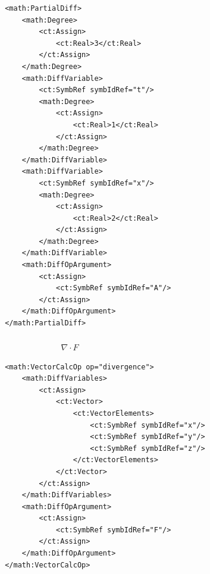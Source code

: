 \lstset{language=XML}
\begin{lstlisting}
                    <math:PartialDiff>
                        <math:Degree>
                            <ct:Assign>
                                <ct:Real>3</ct:Real>
                            </ct:Assign>
                        </math:Degree>
                        <math:DiffVariable>
                            <ct:SymbRef symbIdRef="t"/>
                            <math:Degree>
                                <ct:Assign>
                                    <ct:Real>1</ct:Real>
                                </ct:Assign>
                            </math:Degree>
                        </math:DiffVariable>
                        <math:DiffVariable>
                            <ct:SymbRef symbIdRef="x"/>
                            <math:Degree>
                                <ct:Assign>
                                    <ct:Real>2</ct:Real>
                                </ct:Assign>
                            </math:Degree>
                        </math:DiffVariable>
                        <math:DiffOpArgument>
                            <ct:Assign>
                                <ct:SymbRef symbIdRef="A"/>
                            </ct:Assign>
                        </math:DiffOpArgument>
                    </math:PartialDiff>
\end{lstlisting}

\subsubsection*{}

\begin{align}
 \nabla \cdot F  \nonumber 
\end{align}

\lstset{language=XML}
\begin{lstlisting}
                    <math:VectorCalcOp op="divergence">
                        <math:DiffVariables>
                            <ct:Assign>
                                <ct:Vector>
                                    <ct:VectorElements>
                                        <ct:SymbRef symbIdRef="x"/>
                                        <ct:SymbRef symbIdRef="y"/>
                                        <ct:SymbRef symbIdRef="z"/>
                                    </ct:VectorElements>
                                </ct:Vector>
                            </ct:Assign>
                        </math:DiffVariables>
                        <math:DiffOpArgument>
                            <ct:Assign>
                                <ct:SymbRef symbIdRef="F"/>
                            </ct:Assign>
                        </math:DiffOpArgument>
                    </math:VectorCalcOp>
\end{lstlisting}

